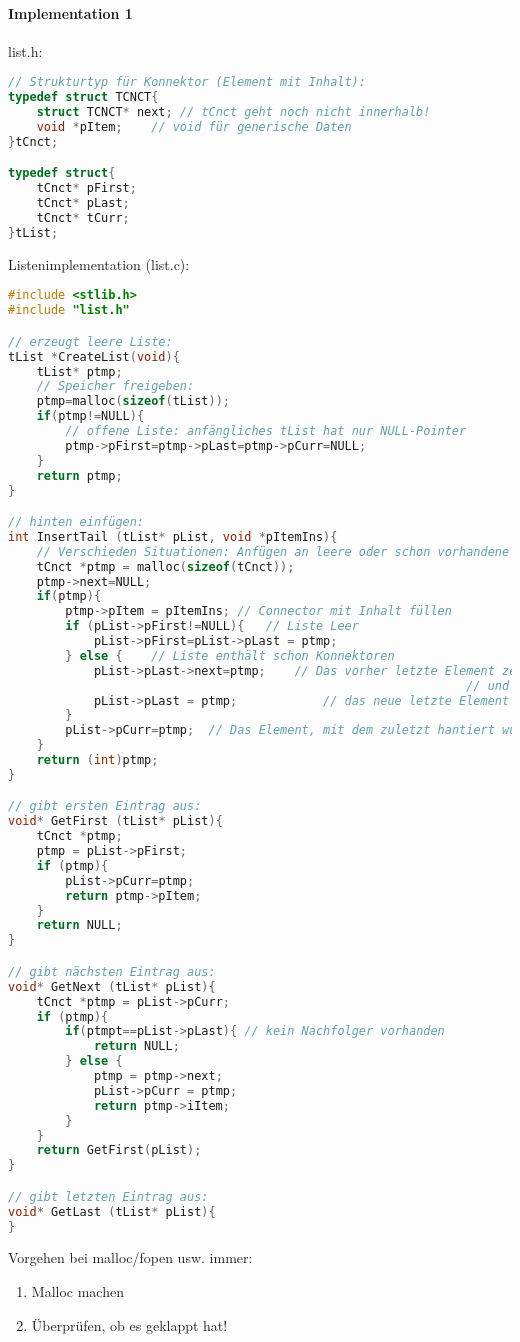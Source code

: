 \paragraph{Implementation 1}\parskp
list.h:
\begin{lstlisting}[language=C]
// Strukturtyp für Konnektor (Element mit Inhalt):
typedef struct TCNCT{
	struct TCNCT* next;	// tCnct geht noch nicht innerhalb!
	void *pItem;	// void für generische Daten
}tCnct;

typedef struct{
	tCnct* pFirst;
	tCnct* pLast;
	tCnct* tCurr;
}tList;
\end{lstlisting}
Listenimplementation (list.c):
\begin{lstlisting}[language=C]
#include <stlib.h>
#include "list.h"

// erzeugt leere Liste:
tList *CreateList(void){
	tList* ptmp;
	// Speicher freigeben:
	ptmp=malloc(sizeof(tList));
	if(ptmp!=NULL){
		// offene Liste: anfängliches tList hat nur NULL-Pointer
		ptmp->pFirst=ptmp->pLast=ptmp->pCurr=NULL;
	}
	return ptmp;
}

// hinten einfügen:
int InsertTail (tList* pList, void *pItemIns){
	// Verschieden Situationen: Anfügen an leere oder schon vorhandene Liste
	tCnct *ptmp = malloc(sizeof(tCnct));
	ptmp->next=NULL;
	if(ptmp){
		ptmp->pItem = pItemIns;	// Connector mit Inhalt füllen
		if (pList->pFirst!=NULL){	// Liste Leer
			pList->pFirst=pList->pLast = ptmp;
		} else {	// Liste enthält schon Konnektoren
			pList->pLast->next=ptmp;	// Das vorher letzte Element zeigt nun auf das eingefügte
																// und damit neue letzte Element
			pList->pLast = ptmp;			// das neue letzte Element
		}
		pList->pCurr=ptmp;	// Das Element, mit dem zuletzt hantiert wurde ist pCurr
	}
	return (int)ptmp;
}

// gibt ersten Eintrag aus:
void* GetFirst (tList* pList){
	tCnct *ptmp;
	ptmp = pList->pFirst;
	if (ptmp){
		pList->pCurr=ptmp;
		return ptmp->pItem;
	}
	return NULL;
}

// gibt nächsten Eintrag aus:
void* GetNext (tList* pList){
	tCnct *ptmp = pList->pCurr;
	if (ptmp){
		if(ptmpt==pList->pLast){ // kein Nachfolger vorhanden
			return NULL;
		} else {
			ptmp = ptmp->next;
			pList->pCurr = ptmp;
			return ptmp->iItem;
		}
	} 
	return GetFirst(pList);
}

// gibt letzten Eintrag aus:
void* GetLast (tList* pList){
}

\end{lstlisting}

Vorgehen bei malloc/fopen usw. immer:
\begin{enumerate}
\item Malloc machen
\item Überprüfen, ob es geklappt hat!
\end{enumerate}

